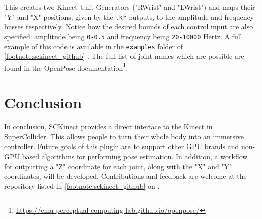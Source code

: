 \documentclass{article}
\begin{document}
This creates two Kinect Unit Generators ("RWrist" and "LWrist") and maps their "Y" and "X" positions, given by the \texttt{.kr} outputs, to the amplitude and frequency busses respectively. Notice how the desired bounds of each control input are also specified: amplitude being \texttt{0-0.5} and frequency being \texttt{20-10000} Hertz. A full example of this code is available in the \texttt{examples} folder of \cref{footnote:sckinect_github} . The full list of joint names which are possible are found in the \href{https://cmu-perceptual-computing-lab.github.io/openpose/web/html/doc/md\_doc\_02\_output.html\#autotoc\_md41}{OpenPose documentation}\footnote{\href{https://cmu-perceptual-computing-lab.github.io/openpose/web/html/doc/md\_doc\_02\_output.html\#autotoc\_md41}{https://cmu-perceptual-computing-lab.github.io/openpose/}\label{footnote:openpose_documentation}}.

\section{Conclusion}
In conclusion, SCKinect provides a direct interface to the Kinect in SuperCollider. This allows people to turn their whole body into an immersive controller. Future goals of this plugin are to support other GPU brands and non-GPU based algorithms for performing pose estimation. In addition, a workflow for outputting a "Z" coordinate for each joint, along with the "X" and "Y" coordinates, will be developed. Contributions and feedback are welcome at the repository listed in \cref{footnote:sckinect_github} on .


\end{document}
